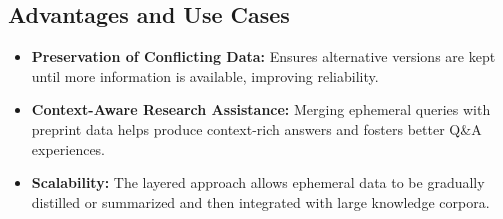 \documentclass[12pt]{article}
\begin{document}
\subsection*{Advantages and Use Cases}
\begin{itemize}
  \item \textbf{Preservation of Conflicting Data:} Ensures alternative versions are kept 
        until more information is available, improving reliability.
  \item \textbf{Context-Aware Research Assistance:} Merging ephemeral queries with 
        preprint data helps produce context-rich answers and fosters better Q\&A experiences.
  \item \textbf{Scalability:} The layered approach allows ephemeral data to be gradually 
        distilled or summarized and then integrated with large knowledge corpora.
\end{itemize}
\end{document}
